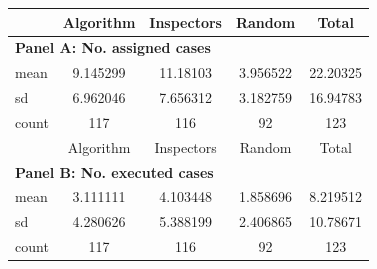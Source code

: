\begin{tabular}{l*{4}{c}} \hline
            &   Algorithm&  Inspectors&      Random&       Total\\
\hline \multicolumn{5}{l}{\textbf{Panel A: No. assigned cases}} \\
mean        &    9.145299&    11.18103&    3.956522&    22.20325\\
sd          &    6.962046&    7.656312&    3.182759&    16.94783\\
count       &         117&         116&          92&         123\\
\hline
            &   Algorithm&  Inspectors&      Random&       Total\\
\hline \multicolumn{5}{l}{\textbf{Panel B: No. executed cases}} \\
mean        &    3.111111&    4.103448&    1.858696&    8.219512\\
sd          &    4.280626&    5.388199&    2.406865&    10.78671\\
count       &         117&         116&          92&         123\\
\hline \end{tabular}
